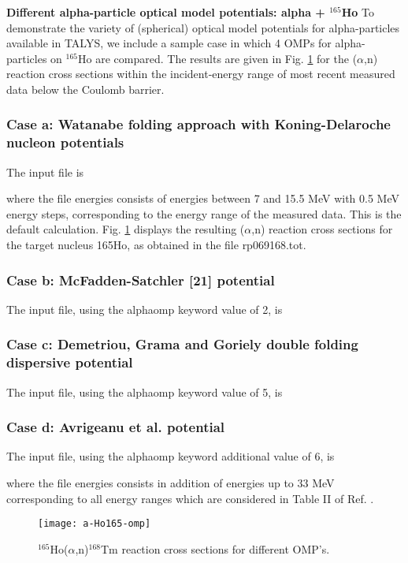 \begin{samplecase}
{\bf Different alpha-particle optical model potentials: alpha + ${}^{165}$Ho}\newline
To demonstrate the variety of (spherical) optical model potentials for 
alpha-particles available in TALYS, we include a sample case in which 4 OMPs 
for alpha-particles on ${}^{165}$Ho are compared. The results are given in Fig. \ref{an} 
for the ($\alpha$,n) reaction cross sections within the incident-energy range 
of most recent measured data \cite{Glorius2014} below the Coulomb barrier.

\subsubsection{Case a: Watanabe folding approach with Koning-Delaroche nucleon potentials}
The input file is


where the file energies consists of energies between 7 and 15.5 MeV with 
0.5 MeV energy steps, corresponding to the energy range of the measured data.
This is the default calculation. Fig. \ref{an} displays the resulting 
($\alpha$,n) reaction cross sections for the target nucleus 165Ho, 
as obtained in the file rp069168.tot.

\subsubsection{Case b: McFadden-Satchler [21] potential}

The input file, using the alphaomp keyword value of 2, is


\subsubsection{Case c: Demetriou, Grama and Goriely \cite{Demetriou2002} double folding dispersive potential}

The input file, using the alphaomp keyword value of 5, is


\subsubsection{Case d: Avrigeanu et al. \cite{Avrigeanu2014} potential}

The input file, using the alphaomp keyword additional value of 6, is


where the file energies consists in addition of energies up to 33 MeV corresponding to all energy ranges which are considered in Table II of Ref. \cite{Avrigeanu2014}.
\end{samplecase}
\begin{figure}
\centering\texttt{[image: a-Ho165-omp]}
\caption{$^{165}$Ho($\alpha$,n)$^{168}$Tm reaction cross sections for different OMP's.}
\label{an}
\end{figure}
